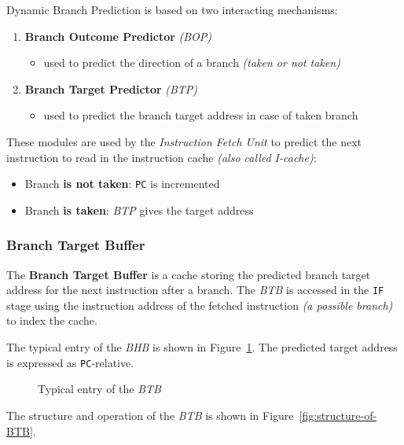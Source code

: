 \documentclass[english]{article}
\begin{document}
\bigskip
Dynamic Branch Prediction is based on two interacting mechanisms:

\begin{enumerate}
  \item \textbf{Branch Outcome Predictor} \textit{(BOP)}
        \begin{itemize}
          \item used to predict the direction of a branch \textit{(taken or not taken)}
        \end{itemize}
  \item \textbf{Branch Target Predictor} \textit{(BTP)}
        \begin{itemize}
          \item used to predict the branch target address in case of taken branch
        \end{itemize}
\end{enumerate}

These modules are used by the \textit{Instruction Fetch Unit} to predict the next instruction to read in the instruction cache \textit{(also called I-cache)}:

\begin{itemize}
  \item Branch \textbf{is not taken}: \texttt{PC} is incremented
  \item Branch \textbf{is taken}: \textit{BTP} gives the target address
\end{itemize}

\subsubsection{Branch Target Buffer}

The \textbf{Branch Target Buffer} is a cache storing the predicted branch target address for the next instruction after a branch.
The \textit{BTB} is accessed in the \texttt{IF} stage using the instruction address of the fetched instruction \textit{(a possible branch)} to index the cache.

The typical entry of the \textit{BHB} is shown in Figure~\ref{fig:typical-entry-BTB}.
The predicted target address is expressed as \texttt{PC}-relative.

\begin{figure}[htbp]
  \bigskip
  \centering
  \caption{Typical entry of the \textit{BTB}}
  \label{fig:typical-entry-BTB}
  \bigskip
\end{figure}

The structure and operation of the \textit{BTB} is shown in Figure~\ref{fig:structure-of-BTB}.
\end{document}
